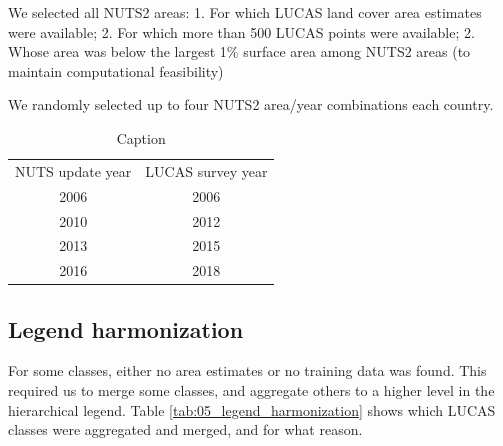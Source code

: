 We selected all NUTS2 areas:
1. For which LUCAS land cover area estimates were available;
2. For which more than 500 LUCAS points were available;
2. Whose area was below the largest 1\% surface area among NUTS2 areas (to maintain computational feasibility)

We randomly selected up to four NUTS2 area/year combinations each country.

\begin{table}[H]
    \centering
    \begin{tabular}{c|c}
         NUTS update year &  LUCAS survey year\\
         2006 & 2006 \\
         2010 & 2012 \\
         2013 & 2015 \\
         2016 & 2018 \\
    \end{tabular}
    \caption{Caption}
    \label{tab:05_NUTS_LUCAS}
\end{table}

\subsection{Legend harmonization}
For some classes, either no area estimates or no training data was found. This required us to merge some classes, and aggregate others to a higher level in the hierarchical legend. Table \ref{tab:05_legend_harmonization} shows which LUCAS classes were aggregated and merged, and for what reason.

